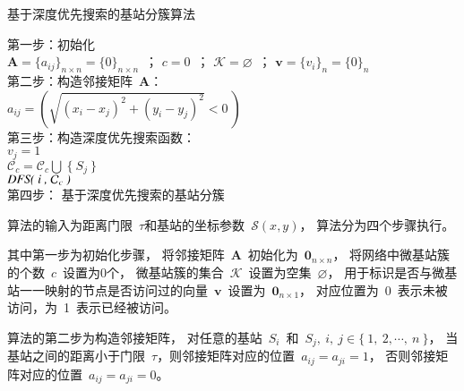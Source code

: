 \begin{algorithm}[!htb]
\caption{ 基于深度优先搜索的基站分簇算法 }
\label{algorithm_bs_dfs}
\small
{}
\Begin
{
    第一步：初始化\\
    $\mathbf{A}=\{a_{ij}\}_{n\times n}=\{0\}_{n\times n}$~；
    $c=0$~；
    $\mathcal{K}=\varnothing$~；
    $\mathbf{v}=\{v_i\}_n=\{0\}_n$~\\
    第二步：构造邻接矩阵~$\mathbf{A}$：\\
    {
        {
          $a_{ij}=(\sqrt{({x_i} - {x_j})^2+(y_i-y_j)^2} < 0~)$  \\
        }
    }
    第三步：构造深度优先搜索函数：\\
    {
      {
        {
          $v_{j}=1$ \\
          $\mathcal{C}_c=\mathcal{C}_c \bigcup~ \{~S_j~\}$\\
          $\emph{DFS(~i~,~}\mathcal{C}_c ~\emph{)}$\\
        }
      }
    }
    第四步： 基于深度优先搜索的基站分簇
    {
    }
}
\end{algorithm}

算法的输入为距离门限~$\tau$和基站的坐标参数~$\mathcal{S}(x,y)$，
算法分为四个步骤执行。

其中第一步为初始化步骤，
将邻接矩阵~$\mathbf{A}$~初始化为~$\mathbf{0}_{n\times n}$，
将网络中微基站簇的个数~$c$~设置为0个，
微基站簇的集合~$\mathcal{K}$~设置为空集~$\varnothing$，
用于标识是否与微基站一一映射的节点是否访问过的向量~$\mathbf{v}$~设置为~$\mathbf{0}_{n\times 1}$，
对应位置为~0~表示未被访问，为~1~表示已经被访问。

算法的第二步为构造邻接矩阵，
对任意的基站~$S_i$~和~$S_j, ~i, ~j \in \{~1,~2,\cdots,~n~\}$，
当基站之间的距离小于门限~$\tau$，则邻接矩阵对应的位置~$a_{ij}=a_{ji}=1$，
否则邻接矩阵对应的位置~$a_{ij}=a_{ji}=0$。

